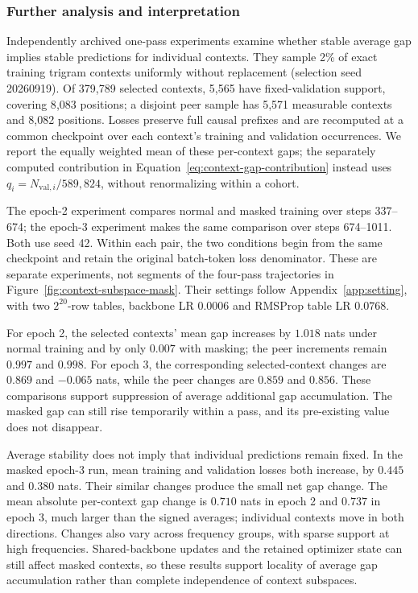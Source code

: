 \subsubsection{Further analysis and interpretation}
\label{app:mask-reconciliation}

Independently archived one-pass experiments examine whether stable average gap implies stable predictions for individual contexts. They sample 2\% of exact training trigram contexts uniformly without replacement (selection seed 20260919). Of 379{,}789 selected contexts, 5{,}565 have fixed-validation support, covering 8{,}083 positions; a disjoint peer sample has 5{,}571 measurable contexts and 8{,}082 positions. Losses preserve full causal prefixes and are recomputed at a common checkpoint over each context's training and validation occurrences. We report the equally weighted mean of these per-context gaps; the separately computed contribution in Equation~\eqref{eq:context-gap-contribution} instead uses $q_i=N_{\mathrm{val},i}/589{,}824$, without renormalizing within a cohort.

The epoch-2 experiment compares normal and masked training over steps 337--674; the epoch-3 experiment makes the same comparison over steps 674--1011. Both use seed 42. Within each pair, the two conditions begin from the same checkpoint and retain the original batch-token loss denominator. These are separate experiments, not segments of the four-pass trajectories in Figure~\ref{fig:context-subspace-mask}. Their settings follow Appendix~\ref{app:setting}, with two $2^{20}$-row tables, backbone LR $0.0006$ and RMSProp table LR $0.0768$.

For epoch 2, the selected contexts' mean gap increases by $1.018$ nats under normal training and by only $0.007$ with masking; the peer increments remain $0.997$ and $0.998$. For epoch 3, the corresponding selected-context changes are $0.869$ and $-0.065$ nats, while the peer changes are $0.859$ and $0.856$. These comparisons support suppression of average additional gap accumulation. The masked gap can still rise temporarily within a pass, and its pre-existing value does not disappear.

Average stability does not imply that individual predictions remain fixed. In the masked epoch-3 run, mean training and validation losses both increase, by $0.445$ and $0.380$ nats. Their similar changes produce the small net gap change. The mean absolute per-context gap change is $0.710$ nats in epoch 2 and $0.737$ in epoch 3, much larger than the signed averages; individual contexts move in both directions. Changes also vary across frequency groups, with sparse support at high frequencies. Shared-backbone updates and the retained optimizer state can still affect masked contexts, so these results support locality of average gap accumulation rather than complete independence of context subspaces.

